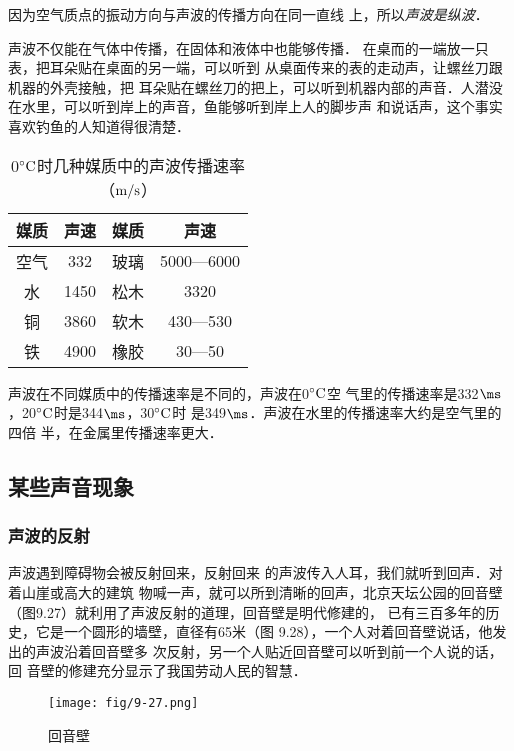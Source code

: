 因为空气质点的振动方向与声波的传播方向在同一直线
上，所以\textit{声波是纵波}．

声波不仅能在气体中传播，在固体和液体中也能够传播．
在桌而的一端放一只表，把耳朵贴在桌面的另一端，可以听到
从桌面传来的表的走动声，让螺丝刀跟机器的外壳接触，把
耳朵贴在螺丝刀的把上，可以听到机器内部的声音．人潜没
在水里，可以听到岸上的声音，鱼能够听到岸上人的脚步声
和说话声，这个事实喜欢钓鱼的人知道得很清楚．

\begin{table}\centering
    \caption{0$^\circ {\rm C}$时几种媒质中的声波传播速率（${\rm m/s}$）}
    \begin{tabular}{cccc}
        \hline
        媒质&        声速&        媒质&        声速\\
        \hline
        空气&       332&        玻璃&        5000—6000\\
        水&        1450&        松木&        3320\\
        铜&        3860&        软木&        430—530\\
        铁&        4900&        橡胶&        30—50\\
        \hline
    \end{tabular}
\end{table}

声波在不同媒质中的传播速率是不同的，声波在0$^\circ {\rm C}$空
气里的传播速率是332$\ms$，20$^\circ {\rm C}$时是344$\ms$，30$^\circ {\rm C}$时
是349$\ms$．声波在水里的传播速率大约是空气里的四倍
半，在金属里传播速率更大．

\subsection{某些声音现象}
\subsubsection{声波的反射}

声波遇到障碍物会被反射回来，反射回来
的声波传入人耳，我们就听到回声．对着山崖或高大的建筑
物喊一声，就可以所到清晰的回声，北京天坛公园的回音壁
（图9.27）就利用了声波反射的道理，回音壁是明代修建的，
已有三百多年的历史，它是一个圆形的墙壁，直径有65米（图
9.28），一个人对着回音壁说话，他发出的声波沿着回音壁多
次反射，另一个人贴近回音壁可以听到前一个人说的话，回
音壁的修建充分显示了我国劳动人民的智慧．

\begin{figure}[htp]
    \centering
    \texttt{[image: fig/9-27.png]}
    \caption{回音壁}
\end{figure}

